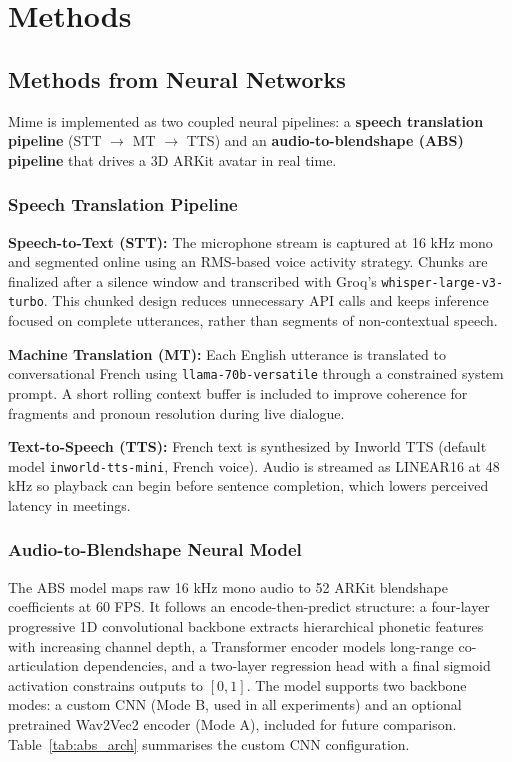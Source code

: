 \chapter{Methods}

\section{Methods from Neural Networks}

Mime is implemented as two coupled neural pipelines: a \textbf{speech translation pipeline} (STT $\rightarrow$ MT $\rightarrow$ TTS) and an \textbf{audio-to-blendshape (ABS) pipeline} that drives a 3D ARKit avatar in real time.

\subsection{Speech Translation Pipeline}

\noindent\textbf{Speech-to-Text (STT):} The microphone stream is captured at 16 kHz mono and segmented online using an RMS-based voice activity strategy. Chunks are finalized after a silence window and transcribed with Groq's \texttt{whisper\allowbreak-large\allowbreak-v3\allowbreak-turbo}. This chunked design reduces unnecessary API calls and keeps inference focused on complete utterances, rather than segments of non-contextual speech.

\noindent\textbf{Machine Translation (MT):} Each English utterance is translated to conversational French using \texttt{llama\allowbreak-70b\allowbreak-versatile} through a constrained system prompt. A short rolling context buffer is included to improve coherence for fragments and pronoun resolution during live dialogue.

\noindent\textbf{Text-to-Speech (TTS):} French text is synthesized by Inworld TTS (default model \texttt{inworld\allowbreak-tts\allowbreak-mini}, French voice). Audio is streamed as LINEAR16\cite{linear16} at 48 kHz so playback can begin before sentence completion, which lowers perceived latency in meetings.

\subsection{Audio-to-Blendshape Neural Model}

The ABS model maps raw 16 kHz mono audio to 52 ARKit blendshape coefficients at 60 FPS. It follows an encode-then-predict structure: a four-layer progressive 1D convolutional backbone extracts hierarchical phonetic features with increasing channel depth, a Transformer encoder models long-range co-articulation dependencies, and a two-layer regression head with a final sigmoid activation constrains outputs to $[0,1]$. The model supports two backbone modes: a custom CNN (Mode B, used in all experiments) and an optional pretrained Wav2Vec2 encoder \cite{wav2vec2} (Mode A), included for future comparison. Table~\ref{tab:abs_arch} summarises the custom CNN configuration.

